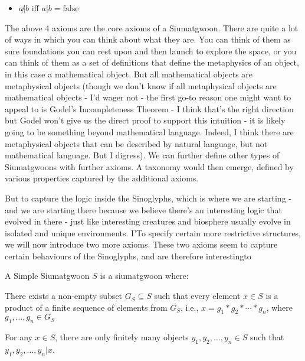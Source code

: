 \begin{itemize}
\item $a\not|b$ iff $a|b = \text{false}$
\end{itemize}

The above 4 axioms are the core axioms of a Siumatgwoon. There are quite a lot of ways in which you can think about what they are. You can think of them as sure foundations you can rest upon and then launch to explore the space, or you can think of them as a set of definitions that define the metaphysics of an object, in this case a mathematical object. But all mathematical objects are metaphysical objects (though we don't know if all metaphysical objects are mathematical objects - I'd wager not - the first go-to reason one might want to appeal to is Godel's Incompleteness Theorem - I think that's the right direction but Godel won't give us the direct proof to support this intuition - it is likely going to be something beyond mathematical language. Indeed, I think there are metaphysical objects that can be described by natural language, but not mathematical language. But I digress). We can further define other types of Siumatgwoons with further axioms. A taxonomy would then emerge, defined by various properties captured by the additional axioms.

But to capture the logic inside the Sinoglyphs, which is where we are starting - and we are starting there because we believe there's an interesting logic that evolved in there - just like interesting creatures and biosphere usually evolve in isolated and unique environments. I'To specify certain more restrictive structures, we will now introduce two more axioms. 
These two axioms seem to capture certain behaviours of the Sinoglyphs, and are therefore interestingto 


\begin{definition}\label{def:simple}
A Simple Siumatgwoon $S$ is a siumatgwoon where:
\begin{axiom}\label{ax:construct} 
    There exists a non-empty subset $G_{S} \subseteq S$ such that every element $x \in S$ is a product of a finite sequence of elements from $G_S$, i.e., $x = g_1 * g_2 * \cdots * g_n$, where $g_1, \dots, g_n \in G_S$
    \end{axiom}
    
    \begin{axiom}\label{ax:finite} 
        For any $x \in S$, there are only finitely many objects $y_1, y_2, \ldots, y_n \in S$ such that $y_1, y_2, \ldots, y_n | x$.
    \end{axiom}
    
\end{definition}


